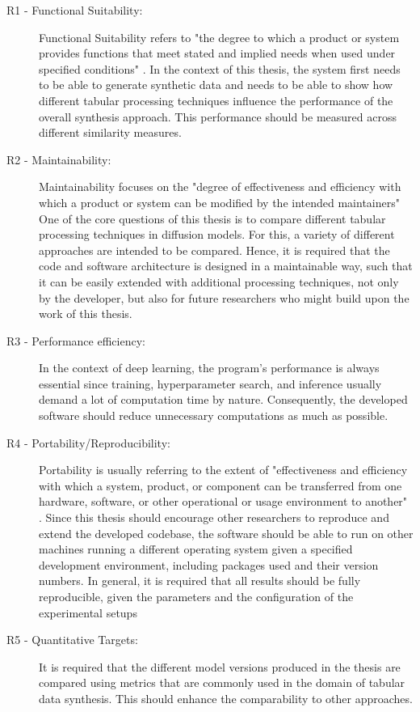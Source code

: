 \begin{description}
	\item[R1 - Functional Suitability:]
		Functional Suitability refers to "the degree to which a product or system provides functions that meet stated and implied needs when used under specified conditions" \cite[p. 219]{bass2013SoftwareArchitecturePractice}.
		In the context of this thesis, the system first needs to be able to generate synthetic data and needs to be able to show how different tabular processing techniques influence the performance of the overall synthesis approach.
		This performance should be measured across different similarity measures.
	\newpage
	\item[R2 - Maintainability:]
		Maintainability focuses on the "degree of effectiveness and efficiency with which a product or system can be modified by the intended maintainers" \cite[p. 220]{bass2013SoftwareArchitecturePractice}
		One of the core questions of this thesis is to compare different tabular processing techniques in diffusion models.
		For this, a variety of different approaches are intended to be compared.
		Hence, it is required that the code and software architecture is designed in a maintainable way, such that it can be easily extended with additional processing techniques, not only by the developer,
		but also for future researchers who might build upon the work of this thesis.

	\item[R3 - Performance efficiency:]
		In the context of deep learning, the program's performance is always essential since training, hyperparameter search, and inference usually demand a lot of computation time by nature.
		Consequently, the developed software should reduce unnecessary computations as much as possible.

	\item[R4 - Portability/Reproducibility:]
		Portability is usually referring to the extent of "effectiveness and efficiency with which a system, product, or component can be transferred from one hardware, software,
		or other operational or usage environment to another" \cite[p. 220]{bass2013SoftwareArchitecturePractice}.
		Since this thesis should encourage other researchers to reproduce and extend the developed codebase, the software should be able to run on other machines running a different operating system given a specified development environment,
		including packages used and their version numbers.
		In general, it is required that all results should be fully reproducible, given the parameters and the configuration of the experimental setups

	\item[R5 - Quantitative Targets:]
		It is required that the different model versions produced in the thesis are compared using metrics that are commonly used in the domain of tabular data synthesis.
		This should enhance the comparability to other approaches.
\end{description}


